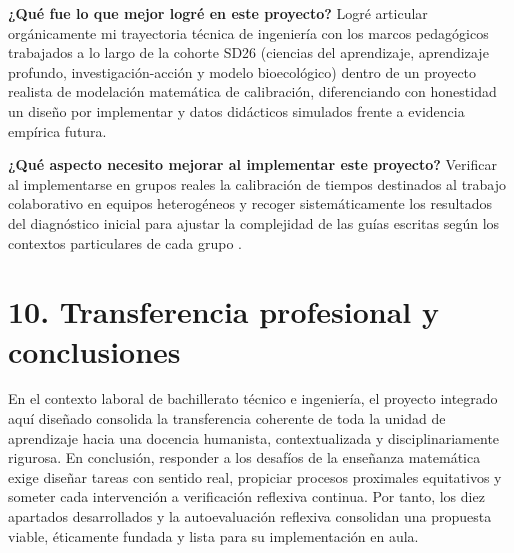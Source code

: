 \documentclass[spanish,letterpaper,oneside]{article}
\begin{document}
\begin{tcolorbox}[colback=iiiepeMint,colframe=iiiepeAqua!80!black,title=\textbf{Reflexión personal sobre el diseño del proyecto},breakable]
\textbf{¿Qué fue lo que mejor logré en este proyecto?} Logré articular orgánicamente mi trayectoria técnica de ingeniería con los marcos pedagógicos trabajados a lo largo de la cohorte SD26 (ciencias del aprendizaje, aprendizaje profundo, investigación-acción y modelo bioecológico) dentro de un proyecto realista de modelación matemática de calibración, diferenciando con honestidad un diseño por implementar y datos didácticos simulados frente a evidencia empírica futura.

\medskip
\textbf{¿Qué aspecto necesito mejorar al implementar este proyecto?} Verificar al implementarse en grupos reales la calibración de tiempos destinados al trabajo colaborativo en equipos heterogéneos y recoger sistemáticamente los resultados del diagnóstico inicial para ajustar la complejidad de las guías escritas según los contextos particulares de cada grupo \citep{restrepo2004investigacion}.
\end{tcolorbox}

\clearpage
\section*{10. Transferencia profesional y conclusiones}
En el contexto laboral de bachillerato técnico e ingeniería, el proyecto integrado aquí diseñado consolida la transferencia coherente de toda la unidad de aprendizaje hacia una docencia humanista, contextualizada y disciplinariamente rigurosa. En conclusión, responder a los desafíos de la enseñanza matemática exige diseñar tareas con sentido real, propiciar procesos proximales equitativos y someter cada intervención a verificación reflexiva continua. Por tanto, los diez apartados desarrollados y la autoevaluación reflexiva consolidan una propuesta viable, éticamente fundada y lista para su implementación en aula.
\end{document}
